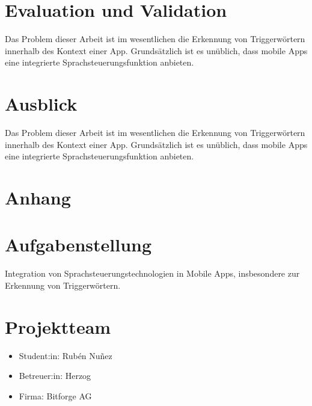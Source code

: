 \documentclass[11pt,a4paper]{article}
\newcommand\blankpage{%
    \null
    \thispagestyle{empty}%
    \addtocounter{page}{-1}%
    \newpage}
\begin{document}
\newpage
\section{Evaluation und Validation}
Das Problem dieser Arbeit ist im wesentlichen die Erkennung von Triggerwörtern innerhalb
des Kontext einer App. Grundsätzlich ist es unüblich, dass mobile Apps eine
integrierte Sprachsteuerungsfunktion anbieten.

\newpage
\section{Ausblick}
Das Problem dieser Arbeit ist im wesentlichen die Erkennung von Triggerwörtern innerhalb
des Kontext einer App. Grundsätzlich ist es unüblich, dass mobile Apps eine
integrierte Sprachsteuerungsfunktion anbieten.


\newpage
\section{Anhang}

\newpage

\listoffigures
{}
\listoftables
\printbibliography[title=Literaturverzeichnis, heading=bibintoc]





\newpage
\pagecolor{ba-gray}
\afterpage{\nopagecolor}
\blankpage

\newpage
\section*{Aufgabenstellung}
Integration von Sprachsteuerungstechnologien in Mobile Apps, insbesondere zur Erkennung
von Triggerwörtern.

\section*{Projektteam}
\begin{itemize}
    \item Student:in: Rubén Nuñez
    \item Betreuer:in: Herzog
    \item Firma: Bitforge AG
\end{itemize}
\end{document}
